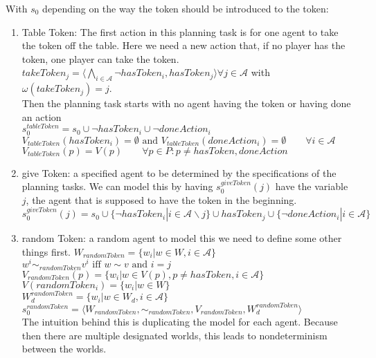With $s_0$ depending on the way the token should be introduced to the token:
\begin{enumerate}
  \item Table Token: The first action in this planning task is for one agent to take the token off the table. Here we need a new action that, if no player has the token, one player can take the token.\\
    $takeToken_j=\langle \bigwedge\limits_{i \in \mathcal{A}}
    \neg hasToken_i, hasToken_j \rangle \forall j \in \mathcal{A}$ with $\omega(takeToken_j)=j$. \\
    Then the planning task starts with no agent having the token or having done an action \\
    $s_0^{tableToken} = s_0 \cup \neg hasToken_i \cup \neg doneAction_i$ \\
    $V_{tableToken}(hasToken_i)=\emptyset \text{ and } V_{tableToken}(doneAction_i)=\emptyset \qquad \forall i\in \mathcal{A}$\\
    $V_{tableToken}(p)=V(p) \qquad \forall p\in P : p \not = hasToken, doneAction$

  \item give Token:
    a specified agent to be determined by the specifications of the planning tasks. We can model this by having $s_0^{giveToken}(j)$ have the variable $j$, the agent that is supposed to have the token in the beginning. \\
     $s_0^{giveToken}(j) = s_0 \cup \{\neg hasToken_i|i \in \mathcal{A} \backslash j\} \cup hasToken_j \cup \{\neg doneAction_i|i \in \mathcal{A}\}$

  \item random Token:
    a random agent
    to model this we need to define some other things first.
    $W_{randomToken}=\{w_i|w \in W, i\in \mathcal{A}\}$ \\
    $w^i \sim_{randomToken} v^i \text{ iff } w \sim v \text{ and } i=j$ \\
    $V_{randomToken}(p)=\{w_i|w\in V(p), p \not = hasToken, i\in \mathcal{A}\}$ \\
    $V(randomToken_i)=\{w_i|w \in W\}$ \\
    $W^{randomToken}_d=\{w_i|w\in W_d, i\in \mathcal{A}\}$ \\
    $s_0^{randomToken}=\langle W_{randomToken}, \sim_{randomToken}, V_{randomToken}, W^{randomToken}_d \rangle$ \\
    The intuition behind this is duplicating the model for each agent. Because then there are multiple designated worlds, this leads to nondeterminism between the worlds.
\end{enumerate}




